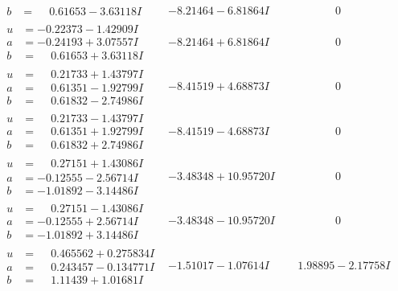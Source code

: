 \documentclass[1p]{elsarticle_modified}
\theoremstyle{definition}
\begin{document}
$$\begin{array}{c|c|c}
\begin{aligned}
b &= \phantom{-}0.61653 - 3.63118 I\end{aligned}
 & -8.21464 - 6.81864 I & \phantom{-0.000000 } 0 \\ \hline\begin{aligned}
u &= -0.22373 - 1.42909 I \\
a &= -0.24193 + 3.07557 I \\
b &= \phantom{-}0.61653 + 3.63118 I\end{aligned}
 & -8.21464 + 6.81864 I & \phantom{-0.000000 } 0 \\ \hline\begin{aligned}
u &= \phantom{-}0.21733 + 1.43797 I \\
a &= \phantom{-}0.61351 - 1.92799 I \\
b &= \phantom{-}0.61832 - 2.74986 I\end{aligned}
 & -8.41519 + 4.68873 I & \phantom{-0.000000 } 0 \\ \hline\begin{aligned}
u &= \phantom{-}0.21733 - 1.43797 I \\
a &= \phantom{-}0.61351 + 1.92799 I \\
b &= \phantom{-}0.61832 + 2.74986 I\end{aligned}
 & -8.41519 - 4.68873 I & \phantom{-0.000000 } 0 \\ \hline\begin{aligned}
u &= \phantom{-}0.27151 + 1.43086 I \\
a &= -0.12555 - 2.56714 I \\
b &= -1.01892 - 3.14486 I\end{aligned}
 & -3.48348 + 10.95720 I & \phantom{-0.000000 } 0 \\ \hline\begin{aligned}
u &= \phantom{-}0.27151 - 1.43086 I \\
a &= -0.12555 + 2.56714 I \\
b &= -1.01892 + 3.14486 I\end{aligned}
 & -3.48348 - 10.95720 I & \phantom{-0.000000 } 0 \\ \hline\begin{aligned}
u &= \phantom{-}0.465562 + 0.275834 I \\
a &= \phantom{-}0.243457 - 0.134771 I \\
b &= \phantom{-}1.11439 + 1.01681 I\end{aligned}
 & -1.51017 - 1.07614 I & \phantom{-}1.98895 - 2.17758 I \\ \hline\begin{aligned}

\end{aligned}
\end{array}$$
\end{document}
